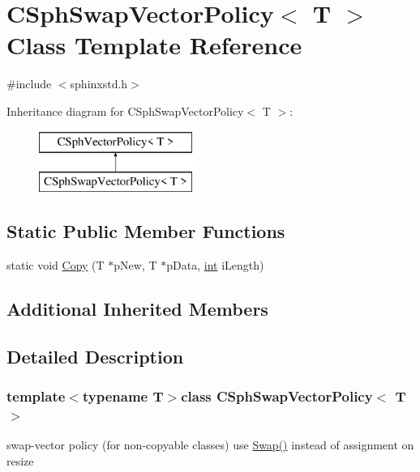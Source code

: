 \hypertarget{classCSphSwapVectorPolicy}{\section{C\-Sph\-Swap\-Vector\-Policy$<$ T $>$ Class Template Reference}
\label{classCSphSwapVectorPolicy}
}


{\ttfamily \#include $<$sphinxstd.\-h$>$}

Inheritance diagram for C\-Sph\-Swap\-Vector\-Policy$<$ T $>$\-:\begin{figure}[H]
\begin{center}
\leavevmode
\includegraphics[height=2.000000cm]{classCSphSwapVectorPolicy}
\end{center}
\end{figure}
\subsection*{Static Public Member Functions}
\begin{DoxyCompactItemize}
\item 
static void \hyperlink{classCSphSwapVectorPolicy_a7ec5a5cbadc39a6540f231e4598defa9}{Copy} (T $\ast$p\-New, T $\ast$p\-Data, \hyperlink{sphinxexpr_8cpp_a4a26e8f9cb8b736e0c4cbf4d16de985e}{int} i\-Length)
\end{DoxyCompactItemize}
\subsection*{Additional Inherited Members}


\subsection{Detailed Description}
\subsubsection*{template$<$typename T$>$class C\-Sph\-Swap\-Vector\-Policy$<$ T $>$}

swap-\/vector policy (for non-\/copyable classes) use \hyperlink{sphinx_8cpp_a13de3eb4991873482f9a386400039a16}{Swap()} instead of assignment on resize 

